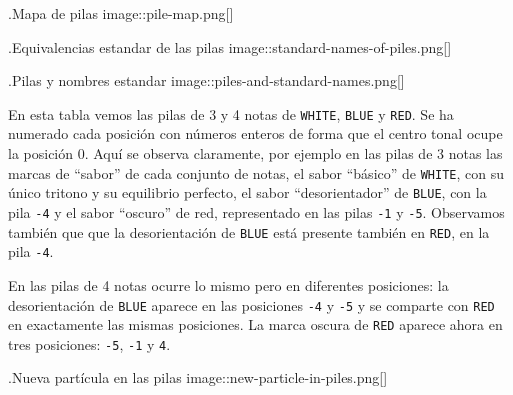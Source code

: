\documentclass[]{article}
\begin{document}
.Mapa de pilas image::pile-map.png{[}{]}

.Equivalencias estandar de las pilas image::standard-names-of-piles.png{[}{]}

.Pilas y nombres estandar image::piles-and-standard-names.png{[}{]}

En esta tabla vemos las pilas de 3 y 4 notas de \texttt{WHITE}, \texttt{BLUE} y \texttt{RED}. Se ha numerado cada posición con números enteros de forma que el centro tonal ocupe la posición 0. Aquí se observa claramente, por ejemplo en las pilas de 3 notas las marcas de ``sabor'' de cada conjunto de notas, el sabor ``básico'' de \texttt{WHITE}, con su único tritono y su equilibrio perfecto, el sabor ``desorientador'' de \texttt{BLUE}, con la pila \texttt{-4} y el sabor ``oscuro'' de red, representado en las pilas \texttt{-1} y \texttt{-5}. Observamos también que que la desorientación de \texttt{BLUE} está presente también en \texttt{RED}, en la pila \texttt{-4}.

En las pilas de 4 notas ocurre lo mismo pero en diferentes posiciones: la desorientación de \texttt{BLUE} aparece en las posiciones \texttt{-4} y \texttt{-5} y se comparte con \texttt{RED} en exactamente las mismas posiciones. La marca oscura de \texttt{RED} aparece ahora en tres posiciones: \texttt{-5}, \texttt{-1} y \texttt{4}.

.Nueva partícula en las pilas image::new-particle-in-piles.png{[}{]}
\end{document}
